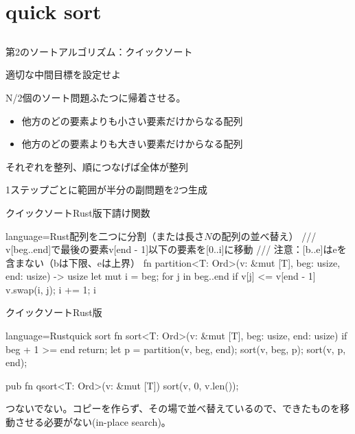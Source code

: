 \documentclass{beamer}
\begin{document}
\section{quick sort}		%
\subsection{}

\begin{frame}[fragile]{第2のソートアルゴリズム：クイックソート}{}

\vfill
適切な中間目標を設定せよ

\vfill
N/2個のソート問題ふたつに帰着させる。

\begin{itemize}%
\item 他方のどの要素よりも小さい要素だけからなる配列
\item 他方のどの要素よりも大きい要素だけからなる配列
\end{itemize}
それぞれを整列、順につなげば全体が整列

\vfill
1ステップごとに範囲が半分の副問題を2つ生成
\end{frame}

\begin{frame}[fragile]{クイックソートRust版下請け関数}{}
\begin{codeof}{language=Rust}{配列を二つに分割（または長さ$N$の配列の並べ替え）}
/// v[beg..end]で最後の要素v[end - 1]以下の要素を[0..i]に移動
/// 注意：[b..e]はeを含まない（bは下限、eは上界）
fn partition<T: Ord>(v: &mut [T], beg: usize, end: usize) -> usize {
    let mut i = beg;
    for j in beg..end {
        if v[j] <= v[end - 1] {
            v.swap(i, j);
            i += 1;
        }
    }
    i
}
\end{codeof}
\end{frame}

\begin{frame}[fragile]{クイックソートRust版}{}
\begin{codeof}{language=Rust}{quick sort}
fn sort<T: Ord>(v: &mut [T], beg: usize, end: usize) {
    if beg + 1 >= end { return; }
    let p = partition(v, beg, end);
    sort(v, beg, p);
    sort(v, p, end);
}

pub fn qsort<T: Ord>(v: &mut [T]) {
    sort(v, 0, v.len());
}
\end{codeof}

\vfill
{\fontsize{9}{9}\selectfont
つないでない。コピーを作らず、その場で並べ替えているので、できたものを移動させる必要がない(in-place search)。
}
\end{frame}
\end{document}
